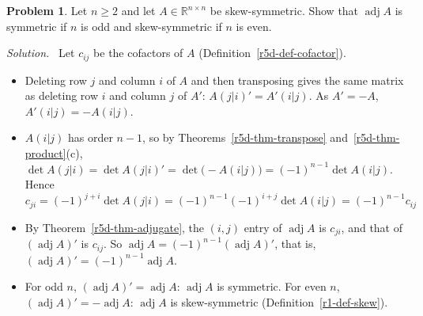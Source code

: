 \documentclass[12pt]{article}
\newcommand{\R}{\mathbb R}
\theoremstyle{definition}
\newtheorem{problem}{Problem}
\newenvironment{solution}{\par\noindent\textit{Solution.}\ }{\par\smallskip}
\begin{document}
\begin{problem}\label{r5d-ex-pr-adj-skew}
Let \(n\geqslant2\) and let \(A\in\R^{n\times n}\) be skew-symmetric. Show that \(\operatorname{adj}A\) is symmetric if
\(n\) is odd and skew-symmetric if \(n\) is even.
\end{problem}
\begin{solution}
Let \(c_{ij}\) be the cofactors of \(A\) (Definition~\ref{r5d-def-cofactor}).
\begin{itemize}
\item Deleting row \(j\) and column \(i\) of \(A\) and then transposing gives the same matrix as deleting row \(i\) and
column \(j\) of \(A'\): \(A(j|i)'=A'(i|j)\). As \(A'=-A\), \(A'(i|j)=-A(i|j)\).
\item \(A(i|j)\) has order \(n-1\), so by Theorems~\ref{r5d-thm-transpose} and~\ref{r5d-thm-product}(c),
\(\det A(j|i)=\det A(j|i)'=\det\bigl(-A(i|j)\bigr)=(-1)^{n-1}\det A(i|j)\). Hence
\[
c_{ji}=(-1)^{j+i}\det A(j|i)=(-1)^{n-1}(-1)^{i+j}\det A(i|j)=(-1)^{n-1}c_{ij}
\]
\item By Theorem~\ref{r5d-thm-adjugate}, the \((i,j)\) entry of \(\operatorname{adj}A\) is \(c_{ji}\), and that of
\((\operatorname{adj}A)'\) is \(c_{ij}\). So \(\operatorname{adj}A=(-1)^{n-1}(\operatorname{adj}A)'\), that is,
\((\operatorname{adj}A)'=(-1)^{n-1}\operatorname{adj}A\).
\item For odd \(n\), \((\operatorname{adj}A)'=\operatorname{adj}A\): \(\operatorname{adj}A\) is symmetric. For even \(n\),
\((\operatorname{adj}A)'=-\operatorname{adj}A\): \(\operatorname{adj}A\) is skew-symmetric (Definition~\ref{r1-def-skew}).
\end{itemize}
\end{solution}
\end{document}
